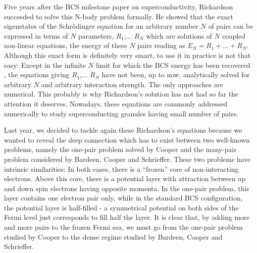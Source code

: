 \documentclass[aps,prb,superscriptaddress,showpacs,reprint,lengthcheck]{revtex4}
\begin{document}
Five years after the BCS milestone paper\cite{BCS} on superconductivity, Richardson succeeded to solve this N-body problem formally\cite{Richardson1,Richardson2}. He showed that 
the exact eigenstates of the Schr\"{o}dinger equation for an arbitrary number $N$ of pairs can be expressed in terms
of $N$ parameters, $R_{1}$,... $R_{N}$ which are solutions of $N$ coupled
non-linear equations, the energy of these $N$ pairs reading as $E
_{N}=R_{1}+...+R_{N}$. Although this exact form is definitely very smart, to
use it in practice is not that easy: Except in the infinite $N$ limit for which the BCS energy has been recovered \cite{Richardson3,gaudin}, the equations giving $R_{1}$,... $R_{N}$  have not been, up to now, analytically solved for arbitrary $N$ and arbitrary interaction strength. The only approaches are numerical\cite{Duk,ortiz,delft}. This probably is why Richardson's solution has not had so far the
attention it deserves. Nowadays, these equations 
are commonly addressed numerically to study superconducting granules having small number of pairs\cite{Duk,Delft,sierra2000,schechter2001}. 

Last year, we decided to tackle again these Richardson's equations because we wanted to reveal the deep connection which has to exist between two well-known problems, namely the
one-pair problem solved by Cooper and the many-pair problem considered by Bardeen, Cooper and Schrieffer. 
These two problems have intrinsic similarities: In
both cases, there is a ``frozen'' core of non-interacting electrons. Above this core, there is
a potential layer with attraction between up and
down spin electrons having opposite momenta. In the one-pair problem, this layer contains one electron pair 
only, while in the standard BCS configuration, the potential
layer is half-filled - a symmetrical potential 
on both sides of the Fermi level just corresponds to fill half the layer.
It is clear that, by adding more and more pairs to the frozen Fermi sea, we must go from the one-pair problem studied by Cooper to the dense regime studied by Bardeen, Cooper and Schrieffer. 
\end{document}
